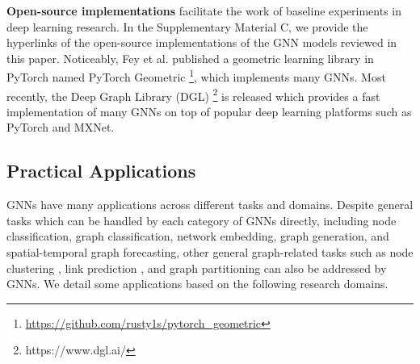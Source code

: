     
    
    \vspace{1mm}
    \textbf{Open-source implementations} facilitate the work of baseline experiments in deep learning research.  In the Supplementary Material C, we provide the hyperlinks of the open-source implementations of the GNN models reviewed in this paper. Noticeably, Fey et al. \cite{fey2018splinecnn} published a geometric learning library in PyTorch named PyTorch Geometric \footnote{\url{https://github.com/rusty1s/pytorch_geometric}}, which implements many GNNs. Most recently, the Deep Graph Library (DGL) \footnote{https://www.dgl.ai/} \cite{wang2019dgl} is released which provides a fast implementation of many GNNs on top of popular deep learning platforms such as PyTorch and MXNet. 

    \subsection{Practical Applications}
    GNNs have many applications across different tasks and domains. Despite general tasks which can be handled by each category of GNNs directly, including node classification, graph classification, network embedding, graph generation, and spatial-temporal graph forecasting, other general graph-related tasks such as node clustering \cite{wang2017mgae}, link prediction \cite{zhang2018link}, and graph partitioning \cite{kawamoto2018mean} can also be addressed by GNNs.  We detail some applications based on the following research domains.%
    
